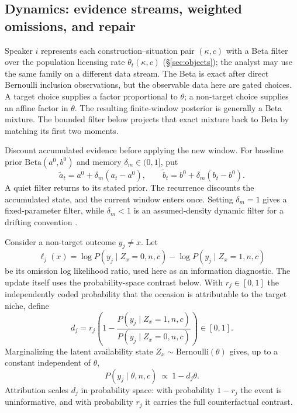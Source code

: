 \subsection{Dynamics: evidence streams, weighted omissions, and repair}
\label{sec:update}

Speaker $i$ represents each construction--situation pair $(\kappa,c)$ with a
Beta filter over the population licensing rate $\theta_t(\kappa,c)$
(\S\ref{sec:objects}); the analyst may use the same family on a different data
stream. The Beta is exact after direct Bernoulli inclusion observations, but the
observable data here are gated choices. A target choice supplies a factor
proportional to $\theta$; a non-target choice supplies an affine factor in
$\theta$. The resulting finite-window posterior is generally a Beta mixture.
The bounded filter below projects that exact mixture back to Beta by matching
its first two moments.

Discount accumulated evidence before applying the new window. For baseline
prior $\mathrm{Beta}(a^0,b^0)$ and memory $\delta_m\in(0,1]$, put
\begin{equation}
\widetilde a_t=a^0+\delta_m(a_t-a^0),\qquad
\widetilde b_t=b^0+\delta_m(b_t-b^0).
\label{eq:baseline-discount}
\end{equation}
A quiet filter returns to its stated prior. The recurrence discounts the
accumulated state, and the current window enters once. Setting $\delta_m=1$
gives a fixed-parameter filter, while $\delta_m<1$ is an assumed-density dynamic
filter for a drifting convention \citep{WestHarrison1997}.

Consider a non-target outcome $y_j\ne x$. Let
\begin{equation}
\ell_j(x)=\log P(y_j\mid Z_x=0,n,c)-
\log P(y_j\mid Z_x=1,n,c)
\label{eq:attributability}
\end{equation}
be its omission log likelihood ratio, used here as an information diagnostic.
The update itself uses the probability-space contrast below. With $r_j\in[0,1]$
the independently coded probability that the occasion is attributable to the
target niche, define
\begin{equation}
d_j=r_j\left(1-
\frac{P(y_j\mid Z_x=1,n,c)}{P(y_j\mid Z_x=0,n,c)}\right)\in[0,1].
\label{eq:preemption-mass}
\end{equation}
Marginalizing the latent availability state
$Z_x\sim\mathrm{Bernoulli}(\theta)$ gives, up to a constant independent of
$\theta$,
\[
P(y_j\mid\theta,n,c)\ \propto\ 1-d_j\theta.
\]
Attribution scales $d_j$ in probability space: with probability $1-r_j$ the
event is uninformative, and with probability $r_j$ it carries the full
counterfactual contrast.

